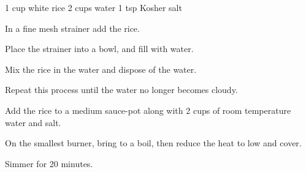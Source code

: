 \dishtype{\side}
\dishother{\vegetarian}
\begin{ingreds}
    1 cup white rice
    2 cups water
    1 tsp Kosher salt          
\end{ingreds}
\begin{method}
    In a fine mesh strainer add the rice.\par
    Place the strainer into a bowl, and fill with water.\par
    Mix the rice in the water and dispose of the water.\par
    Repeat this process until the water no longer becomes cloudy.\par
    Add the rice to a medium sauce-pot along with 2 cups of room temperature water and salt.\par
    On the smallest burner, bring to a boil, then reduce the heat to low and cover.\par
    Simmer for 20 minutes.
\end{method}